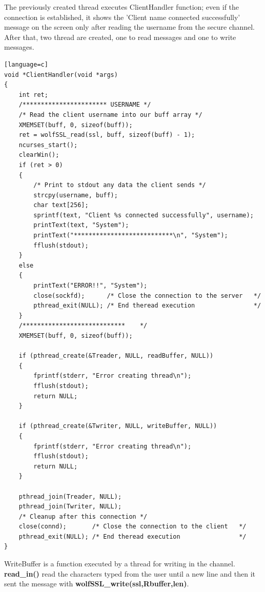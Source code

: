 \documentclass[a4paper,12pt]{article}
\begin{document}
The previously created thread executes ClientHandler function; even if the connection is established, it shows the 'Client name connected successfully' message on the screen only after reading the username from the secure channel.
\\After that, two thread are created, one to read messages and one to write messages.
\begin{lstlisting}[caption={ClientHandler() of SSL server},captionpos=b][language=c]
void *ClientHandler(void *args)
{
    int ret;
    /*********************** USERNAME */
    /* Read the client username into our buff array */
    XMEMSET(buff, 0, sizeof(buff));
    ret = wolfSSL_read(ssl, buff, sizeof(buff) - 1);
    ncurses_start();
    clearWin();
    if (ret > 0)
    {
        /* Print to stdout any data the client sends */
        strcpy(username, buff);
        char text[256];
        sprintf(text, "Client %s connected successfully", username);
        printText(text, "System");
        printText("***************************\n", "System");
        fflush(stdout);
    }
    else
    {
        printText("ERROR!!", "System");
        close(sockfd);      /* Close the connection to the server   */
        pthread_exit(NULL); /* End theread execution                */
    }
    /****************************    */
    XMEMSET(buff, 0, sizeof(buff));

    if (pthread_create(&Treader, NULL, readBuffer, NULL))
    {
        fprintf(stderr, "Error creating thread\n");
        fflush(stdout);
        return NULL;
    }

    if (pthread_create(&Twriter, NULL, writeBuffer, NULL))
    {
        fprintf(stderr, "Error creating thread\n");
        fflush(stdout);
        return NULL;
    }

    pthread_join(Treader, NULL);
    pthread_join(Twriter, NULL);
    /* Cleanup after this connection */
    close(connd);       /* Close the connection to the client   */
    pthread_exit(NULL); /* End theread execution                */
}

\end{lstlisting}
WriteBuffer is a function executed by a thread for writing in the channel. \textbf{read\_in()} read the characters typed from the user until a new line and then it sent the message with \textbf{wolfSSL\_write(ssl,Rbuffer,len)}.
\end{document}

